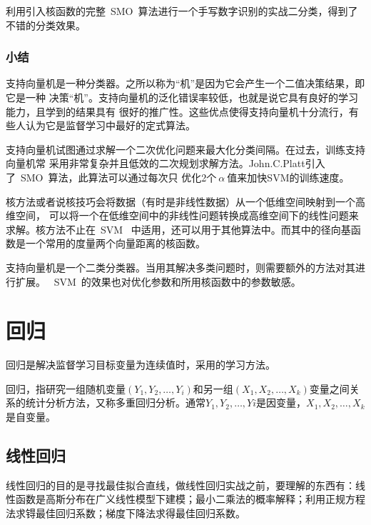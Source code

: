利用引入核函数的完整~SMO~算法进行一个手写数字识别的实战二分类，得到了不错的分类效果。


\subsubsection{小结}
支持向量机是一种分类器。之所以称为“机”是因为它会产生一个二值决策结果，即它是一种
决策“机”。支持向量机的泛化错误率较低，也就是说它具有良好的学习能力，且学到的结果具有
很好的推广性。这些优点使得支持向量机十分流行，有些人认为它是监督学习中最好的定式算法。

支持向量机试图通过求解一个二次优化问题来最大化分类间隔。在过去，训练支持向量机常
采用非常复杂并且低效的二次规划求解方法。John.C.Platt引入了~SMO~算法，此算法可以通过每次只
优化2个$~\alpha~$值来加快SVM的训练速度。

核方法或者说核技巧会将数据（有时是非线性数据）从一个低维空间映射到一个高维空间，
可以将一个在低维空间中的非线性问题转换成高维空间下的线性问题来求解。核方法不止在~SVM~
中适用，还可以用于其他算法中。而其中的径向基函数是一个常用的度量两个向量距离的核函数。

支持向量机是一个二类分类器。当用其解决多类问题时，则需要额外的方法对其进行扩展。
~SVM~的效果也对优化参数和所用核函数中的参数敏感。

















\newpage
\section{回归}
回归是解决监督学习目标变量为连续值时，采用的学习方法。

回归，指研究一组随机变量$(Y_1,Y_2,\ldots,Y_i)$和另一组$(X_1,X_2,\ldots,X_k)$变量之间关系的统计分析方法，又称多重回归分析。通常$Y_1,Y_2,\ldots,Yi$是因变量，$X_1,X_2,\ldots,X_k$是自变量。

\subsection{线性回归}
线性回归的目的是寻找最佳拟合直线，做线性回归实战之前，要理解的东西有：线性函数是高斯分布在广义线性模型下建模；最小二乘法的概率解释；利用正规方程法求锝最佳回归系数；梯度下降法求得最佳回归系数。


